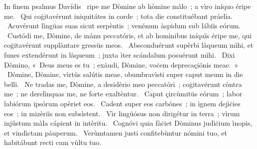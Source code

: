 { In finem psalmus Davídis}
{%
~ripe me Dòmine ab hòmine màlo~; a vìro iníquo éripe me. 
~Qui coġitavérunt iniquitátes in corde~; tota die constituébant práelia. 
~Acuvérunt lìngüas suas sicut serpèntis~; venénum àspidum sub lábiïs eórum. 
~Custódi me, Dòmine, de mànu peccatóris, et ab homìnibus iníquïs éripe me, qui coġitavérunt supplàntare gressüs meos. 
~Absconduérunt supèrbi làqueum mìhi, et funes extendérunt in làqueum~; juxta ìter scándalum posuérunt mìhi. 
~Dixi Dòmino, «~Deus meus es tu~; exáudi, Dòmine, voċem deprecaçiónis meae.~»
~Dòmine, Dòmine, vìrtüs salútis meae, obumbravìsti super caput meum in die belli. 
~Ne tradas me, Dòmine, a desidèrio meo peccatóri~; coġitavérunt còntra me~; ne derelìnquas me, ne forte exaltèntur. 
~Caput çircùmitüs eórum~; labor labiórum ipsórum opèriet eos. 
~Cadent super eos carbónes~; in ìgnem dejìċies eos~; in mizèriïs non subsìstent. 
~Vìr lingüósus non dirigétur in terra~; vìrum injústum màla cápient in intèritu. 
~Cognóvi quia fàċiet Dòminus judìċium ìnopis, et vindìctam páuperum. 
~Verùmtamen justi confitebùntur nómini tuo, et habitábunt recti cum vùltu tuo. 
}

